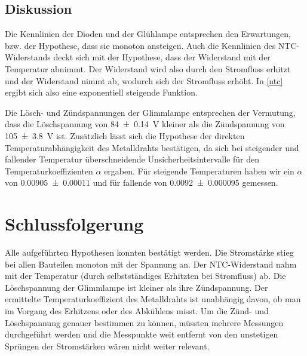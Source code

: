 \documentclass[
	a4paper,
	12pt,
	pagesize,
	ngerman
]{scrartcl}
\begin{document}
	\subsection{Diskussion}
	Die Kennlinien der Dioden und der Glühlampe entsprechen den Erwartungen, bzw. der Hypothese, dass sie monoton ansteigen.
	Auch die Kennlinien des NTC-Widerstands deckt sich mit der Hypothese, dass der Widerstand mit der Temperatur abnimmt.
	Der Widerstand wird also durch den Stromfluss erhitzt und der Widerstand nimmt ab, wodurch sich der Stromfluss erhöht.
	In \cref{ntc} ergibt sich also eine exponentiell steigende Funktion.
	
	Die Lösch- und Zündspannungen der Glimmlampe entsprechen der Vermutung, dass die Löschspannung von \SI{84\pm 0,14}{V} kleiner als die Zündspannung von \SI{105\pm3,8}{V} ist.
	Zusätzlich lässt sich die Hypothese der direkten Temperaturabhängigkeit des Metalldrahts bestätigen, da sich bei steigender und fallender Temperatur überschneidende Unsicherheitsintervalle für den Temperaturkoeffizienten $\alpha$ ergaben.
	Für steigende Temperaturen haben wir ein $\alpha$ von \SI{0,00905\pm 0,00011}{} und für fallende von \SI{0,0092\pm 0,000095}{} gemessen.
	
	\section{Schlussfolgerung}
	Alle aufgeführten Hypothesen konnten bestätigt werden.
	Die Stromstärke stieg bei allen Bauteilen monoton mit der Spannung an.
	Der NTC-Widerstand nahm mit der Temperatur (durch selbstständiges Erhitzten bei Stromfluss) ab.
	Die Löschspannung der Glimmlampe ist kleiner als ihre Zündspannung.
	Der ermittelte Temperaturkoeffizient des Metalldrahts ist unabhängig davon, ob man im Vorgang des Erhitzens oder des Abkühlens misst.
	Um die Zünd- und Löschspannung genauer bestimmen zu können, müssten mehrere Messungen durchgeführt werden und die Messpunkte weit entfernt von den unstetigen Sprüngen der Stromstärken wären nicht weiter relevant.
	
	\printbibliography
\end{document}
